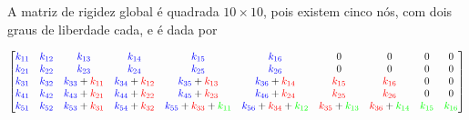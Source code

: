 A matriz de rigidez global é quadrada $10 \times 10$, pois existem cinco nós, com dois graus de liberdade cada, e é dada por
\begin{landscape}
    \begin{equation}
            \begin{bmatrix}
                \textcolor{blue}{k_{11}} &  \textcolor{blue}{k_{12}} &  \textcolor{blue}{k_{13}}                           &  \textcolor{blue}{k_{14}}                             &  \textcolor{blue}{k_{15}}                                                       &  \textcolor{blue}{k_{16}}                                                       & 0                                                    & 0                                                    & 0                          & 0                          \\
                \textcolor{blue}{k_{21}} &  \textcolor{blue}{k_{22}} &  \textcolor{blue}{k_{23}}                           &  \textcolor{blue}{k_{24}}                             &  \textcolor{blue}{k_{25}}                                                       &  \textcolor{blue}{k_{26}}                                                       & 0                                                    & 0                                                    & 0                          & 0                          \\
                \textcolor{blue}{k_{31}} &  \textcolor{blue}{k_{32}} &  \textcolor{blue}{k_{33}} + \textcolor{red}{k_{11}} &  \textcolor{blue}{k_{34}} + \textcolor{red}{k_{12}}   &  \textcolor{blue}{k_{35}} + \textcolor{red}{k_{13}}                             &  \textcolor{blue}{k_{36}} + \textcolor{red}{k_{14}}                             &  \textcolor{red}{k_{15}}                             &  \textcolor{red}{k_{16}}                             & 0                          & 0                          \\
                \textcolor{blue}{k_{41}} &  \textcolor{blue}{k_{42}} &  \textcolor{blue}{k_{43}} + \textcolor{red}{k_{21}} &  \textcolor{blue}{k_{44}} + \textcolor{red}{k_{22}}   &  \textcolor{blue}{k_{45}} + \textcolor{red}{k_{23}}                             &  \textcolor{blue}{k_{46}} + \textcolor{red}{k_{24}}                             &  \textcolor{red}{k_{25}}                             &  \textcolor{red}{k_{26}}                             & 0                          & 0                          \\
                \textcolor{blue}{k_{51}} &  \textcolor{blue}{k_{52}} &  \textcolor{blue}{k_{53}} + \textcolor{red}{k_{31}} &  \textcolor{blue}{k_{54}} + \textcolor{red}{k_{32}}   &  \textcolor{blue}{k_{55}} + \textcolor{red}{k_{33}} + \textcolor{green}{k_{11}} &  \textcolor{blue}{k_{56}} + \textcolor{red}{k_{34}} + \textcolor{green}{k_{12}} &  \textcolor{red}{k_{35}} + \textcolor{green}{k_{13}} &  \textcolor{red}{k_{36}} + \textcolor{green}{k_{14}} &  \textcolor{green}{k_{15}} &  \textcolor{green}{k_{16}} \\

\end{bmatrix}
\end{equation}
\end{landscape}
